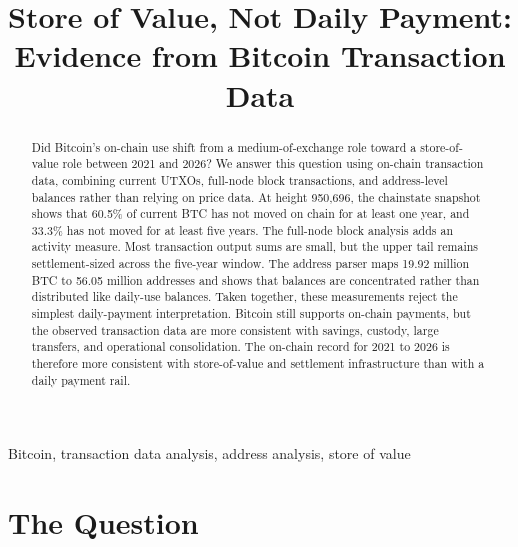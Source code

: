 \documentclass[conference]{IEEEtran}
\newcommand{\btc}{Bitcoin}
\begin{document}
\title{Store of Value, Not Daily Payment:\\
Evidence from \btc{} Transaction Data}

\author{
\and
{}
}

\maketitle

\begin{abstract}
Did \btc{}'s on-chain use shift from a medium-of-exchange role toward
a store-of-value role between 2021 and 2026? We answer this question using
on-chain transaction data, combining current UTXOs, full-node block
transactions, and address-level balances rather than relying on price data.
At height 950{,}696, the chainstate snapshot shows that 60.5\% of current
BTC has not moved on chain for at least one year, and 33.3\% has not moved
for at least five years. The full-node block analysis adds an activity
measure. Most transaction output sums are small, but the upper tail remains
settlement-sized across the five-year window. The address parser maps
19.92 million BTC to 56.05 million addresses and shows that balances are
concentrated rather than distributed like daily-use balances. Taken
together, these measurements reject the simplest daily-payment
interpretation. Bitcoin still supports on-chain payments, but the observed
transaction data are more consistent with savings, custody, large transfers,
and operational consolidation. The on-chain record for 2021 to 2026 is
therefore more consistent with store-of-value and settlement infrastructure than with
a daily payment rail.
\end{abstract}

\begin{IEEEkeywords}
Bitcoin, transaction data analysis, address analysis, store of value
\end{IEEEkeywords}

\section{The Question}\label{sec:intro}
\end{document}
